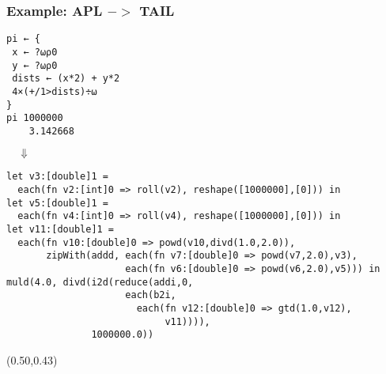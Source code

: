 \documentclass{beamer}
\begin{document}
\begin{frame}[fragile]
\frametitle{Example: APL $->$ TAIL}
{\footnotesize
\begin{verbatim}
pi ← { 
 x ← ?⍵⍴0
 y ← ?⍵⍴0
 dists ← (x*2) + y*2
 4×(+/1>dists)÷⍵
}
pi 1000000
    3.142668
\end{verbatim}
\pause
\vspace{-2mm}
$\quad\Downarrow$
\vspace{-2mm}
\begin{verbatim}
let v3:[double]1 = 
  each(fn v2:[int]0 => roll(v2), reshape([1000000],[0])) in
let v5:[double]1 =
  each(fn v4:[int]0 => roll(v4), reshape([1000000],[0])) in
let v11:[double]1 = 
  each(fn v10:[double]0 => powd(v10,divd(1.0,2.0)),
       zipWith(addd, each(fn v7:[double]0 => powd(v7,2.0),v3),
                     each(fn v6:[double]0 => powd(v6,2.0),v5))) in
muld(4.0, divd(i2d(reduce(addi,0,
                     each(b2i,
                       each(fn v12:[double]0 => gtd(1.0,v12),
                            v11)))),
               1000000.0))
\end{verbatim}
}

\begin{textblock*}{64mm}(0.50\textwidth,0.43\textheight)
\end{textblock*}

\end{frame}




\end{document}
